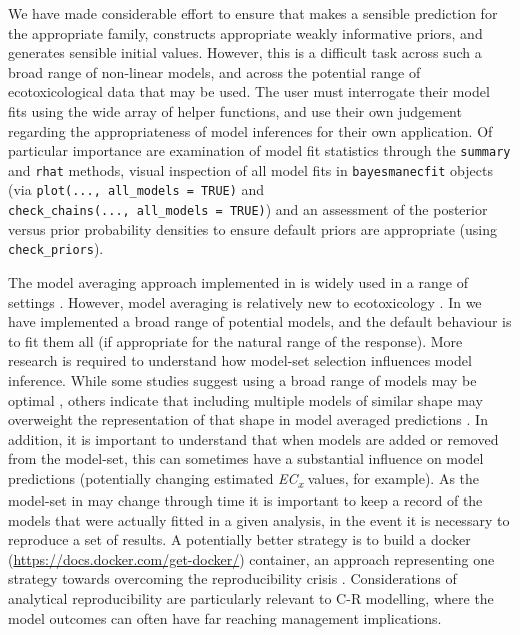 \documentclass[
  shortnames]{jss}
\begin{document}
We have made considerable effort to ensure that  makes a sensible prediction for the appropriate family, constructs appropriate weakly informative priors, and generates sensible initial values. However, this is a difficult task across such a broad range of non-linear models, and across the potential range of ecotoxicological data that may be used. The user must interrogate their model fits using the wide array of helper functions, and use their own judgement regarding the appropriateness of model inferences for their own application. Of particular importance are examination of model fit statistics through the \texttt{summary} and \texttt{rhat} methods, visual inspection of all model fits in \texttt{bayesmanecfit} objects (via \texttt{plot(...,\ all\_models\ =\ TRUE)} and \texttt{check\_chains(...,\ all\_models\ =\ TRUE)}) and an assessment of the posterior versus prior probability densities to ensure default priors are appropriate (using \texttt{check\_priors}).

The model averaging approach implemented in  is widely used in a range of settings \citep[in ecology for example, see][ for a thorough review]{Dormann2018}. However, model averaging is relatively new to ecotoxicology \citep[but see, for example,][]{Shao2014, Thorley2018, fox2020, Wheeler2009}. In  we have implemented a broad range of potential models, and the default behaviour is to fit them all (if appropriate for the natural range of the response). More research is required to understand how model-set selection influences model inference. While some studies suggest using a broad range of models may be optimal \citep{Wheeler2009}, others indicate that including multiple models of similar shape may overweight the representation of that shape in model averaged predictions \citep{fox2020}. In addition, it is important to understand that when models are added or removed from the model-set, this can sometimes have a substantial influence on model predictions (potentially changing estimated \emph{EC\textsubscript{x}} values, for example). As the model-set in  may change through time it is important to keep a record of the models that were actually fitted in a given analysis, in the event it is necessary to reproduce a set of results. A potentially better strategy is to build a docker (\url{https://docs.docker.com/get-docker/}) container, an approach representing one strategy towards overcoming the reproducibility crisis \citep{Baker2016}. Considerations of analytical reproducibility are particularly relevant to C-R modelling, where the model outcomes can often have far reaching management implications.
\end{document}
